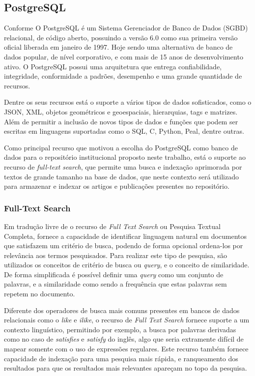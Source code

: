 \subsection{PostgreSQL}

Conforme \cite{2017:Carvalho} O PostgreSQL é um Sistema Gerenciador de
Banco de Dados (SGBD) relacional, de código aberto, possuindo a versão 6.0
como sua primeira versão oficial liberada em janeiro de 1997.
Hoje sendo uma alternativa de banco de dados popular, de nível corporativo,
e com mais de 15 anos de desenvolvimento ativo. O PostgreSQL possui uma
arquitetura que entrega confiabilidade, integridade, conformidade a padrões,
desempenho e uma grande quantidade de recursos.

Dentre os seus recursos está o suporte a vários tipos de dados sofisticados,
como o JSON, XML, objetos geométricos e geoespaciais, hierarquias, tags e matrizes.
Além de permitir a inclusão de novos tipos de dados e funções que podem ser
escritas em linguagens suportadas como o SQL, C, Python, Peal, dentre outras.

Como principal recurso que motivou a escolha do PostgreSQL como banco de dados
para o repositório institucional proposto neste trabalho, está o suporte ao
recurso de \emph{full-text search}, que permite uma busca e indexação aprimorada
por textos de grande tamanho na base de dados, que neste contexto será
utilizado para armazenar e indexar os artigos e publicações presentes no repositório.

\subsubsection{Full-Text Search}

Em tradução livre de \cite{2022:PostgreSQLFullTextSearch}
o recurso de \emph{Full Text Search} ou Pesquisa Textual Completa,
fornece a capacidade de identificar linguagem natural em documentos
que satisfazem um critério de busca, podendo de forma opcional ordena-los
por relevância aos termos pesquisados. Para realizar este tipo de pesquisa,
são utilizados os conceitos de critério de busca ou \emph{query}, e o
conceito de similaridade. De forma simplificada é possível definir uma
\emph{query} como um conjunto de palavras, e a similaridade como sendo a
frequência que estas palavras sem repetem no documento.

Diferente dos operadores de busca mais comuns presentes em bancos de dados
relacionais como o \emph{like} e \emph{ilike}, o recurso de \emph{Full Text Search}
fornece suporte a um contexto linguístico, permitindo por exemplo, a busca por palavras
derivadas como no caso de \emph{satisfies} e \emph{satisfy} do inglês, algo que
seria extramente difícil de mapear somente com o uso de expressões regulares. Este recurso
também fornece capacidade de indexação para uma pesquisa mais rápida, e ranqueamento
dos resultados para que os resultados mais relevantes apareçam no topo da pesquisa.

